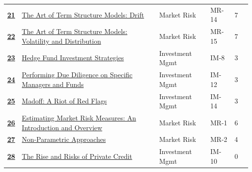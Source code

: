 \begin{longtable}{@{}r@{\hskip 7pt}L{6.35cm}@{\hskip 5pt}l@{\hskip 10pt}l@{\hskip 3pt}r@{\hskip 7pt}r@{}}
\hyperref[roi:21]{{\sffamily\bfseries\color{FRMGold}21}} & \hyperref[roi:21]{{\color{black}The Art of Term Structure Models: Drift}} & {\color{FRMGrey}Market Risk} & {\color{FRMGrey}MR-14} & {\color{FRMGrey}7} & \hyperref[roi:21]{{\sffamily\bfseries\color{FRMNavy}\pageref{roi:21}}} \\
\hyperref[roi:22]{{\sffamily\bfseries\color{FRMGold}22}} & \hyperref[roi:22]{{\color{black}The Art of Term Structure Models: Volatility and Distribution}} & {\color{FRMGrey}Market Risk} & {\color{FRMGrey}MR-15} & {\color{FRMGrey}7} & \hyperref[roi:22]{{\sffamily\bfseries\color{FRMNavy}\pageref{roi:22}}} \\
\hyperref[roi:23]{{\sffamily\bfseries\color{FRMGold}23}} & \hyperref[roi:23]{{\color{black}Hedge Fund Investment Strategies}} & {\color{FRMGrey}Investment Mgmt} & {\color{FRMGrey}IM-8} & {\color{FRMGrey}3} & \hyperref[roi:23]{{\sffamily\bfseries\color{FRMNavy}\pageref{roi:23}}} \\
\hyperref[roi:24]{{\sffamily\bfseries\color{FRMGold}24}} & \hyperref[roi:24]{{\color{black}Performing Due Diligence on Specific Managers and Funds}} & {\color{FRMGrey}Investment Mgmt} & {\color{FRMGrey}IM-12} & {\color{FRMGrey}3} & \hyperref[roi:24]{{\sffamily\bfseries\color{FRMNavy}\pageref{roi:24}}} \\
\hyperref[roi:25]{{\sffamily\bfseries\color{FRMGold}25}} & \hyperref[roi:25]{{\color{black}Madoff: A Riot of Red Flags}} & {\color{FRMGrey}Investment Mgmt} & {\color{FRMGrey}IM-14} & {\color{FRMGrey}3} & \hyperref[roi:25]{{\sffamily\bfseries\color{FRMNavy}\pageref{roi:25}}} \\
\hyperref[roi:26]{{\sffamily\bfseries\color{FRMGold}26}} & \hyperref[roi:26]{{\color{black}Estimating Market Risk Measures: An Introduction and Overview}} & {\color{FRMGrey}Market Risk} & {\color{FRMGrey}MR-1} & {\color{FRMGrey}6} & \hyperref[roi:26]{{\sffamily\bfseries\color{FRMNavy}\pageref{roi:26}}} \\
\hyperref[roi:27]{{\sffamily\bfseries\color{FRMGold}27}} & \hyperref[roi:27]{{\color{black}Non-Parametric Approaches}} & {\color{FRMGrey}Market Risk} & {\color{FRMGrey}MR-2} & {\color{FRMGrey}4} & \hyperref[roi:27]{{\sffamily\bfseries\color{FRMNavy}\pageref{roi:27}}} \\
\hyperref[roi:28]{{\sffamily\bfseries\color{FRMGold}28}} & \hyperref[roi:28]{{\color{black}The Rise and Risks of Private Credit}} & {\color{FRMGrey}Investment Mgmt} & {\color{FRMGrey}IM-10} & {\color{FRMGrey}0} & \hyperref[roi:28]{{\sffamily\bfseries\color{FRMNavy}\pageref{roi:28}}} \\

\end{longtable}
